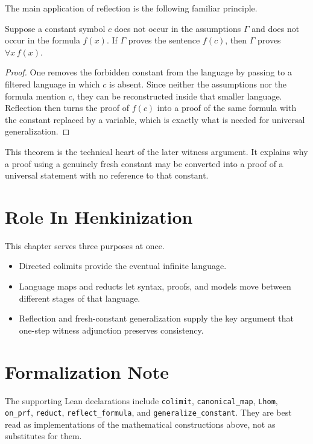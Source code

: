 The main application of reflection is the following familiar principle.

\begin{theorem}
\label{thm:generalize-constant}
Suppose a constant symbol $c$ does not occur in the assumptions $\Gamma$ and
does not occur in the formula $f(x)$. If $\Gamma$ proves the sentence $f(c)$,
then $\Gamma$ proves $\forall x\, f(x)$.
\end{theorem}

\begin{proof}
One removes the forbidden constant from the language by passing to a filtered
language in which $c$ is absent. Since neither the assumptions nor the formula
mention $c$, they can be reconstructed inside that smaller language. Reflection
then turns the proof of $f(c)$ into a proof of the same formula with the
constant replaced by a variable, which is exactly what is needed for universal
generalization.
\end{proof}

This theorem is the technical heart of the later witness argument. It explains
why a proof using a genuinely fresh constant may be converted into a proof of a
universal statement with no reference to that constant.

\section{Role In Henkinization}

This chapter serves three purposes at once.

\begin{itemize}
\item Directed colimits provide the eventual infinite language.
\item Language maps and reducts let syntax, proofs, and models move between
different stages of that language.
\item Reflection and fresh-constant generalization supply the key argument that
one-step witness adjunction preserves consistency.
\end{itemize}

\section{Formalization Note}

The supporting Lean declarations include \texttt{colimit},
\texttt{canonical\_map}, \texttt{Lhom}, \texttt{on\_prf},
\texttt{reduct}, \texttt{reflect\_formula}, and
\texttt{generalize\_constant}. They are best read as implementations of the
mathematical constructions above, not as substitutes for them.
